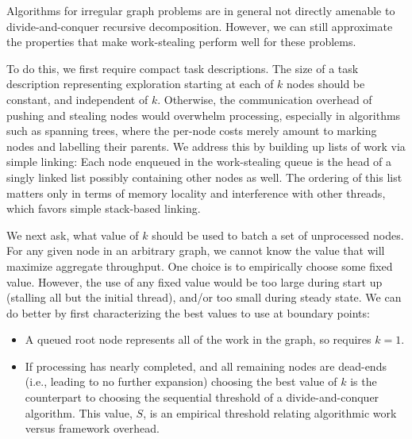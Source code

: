 Algorithms for irregular graph problems are in general not directly
amenable to divide-and-conquer recursive decomposition. However, we
can still approximate the properties that make work-stealing perform
well for these problems.

To do this, we first require compact task descriptions.  The size of a
task description representing exploration starting at each of $k$ nodes
should be constant, and independent of $k$. Otherwise, the communication
overhead of pushing and stealing nodes would overwhelm processing,
especially in algorithms such as spanning trees, where the per-node
costs merely amount to marking nodes and labelling their parents.  We
address this by building up lists of work via simple linking: Each
node enqueued in the work-stealing queue is the head of a singly
linked list possibly containing other nodes as well. The ordering of
this list matters only in terms of memory locality and interference
with other threads, which favors simple stack-based linking.

We next ask, what value of $k$ should be used to batch a set of
unprocessed nodes. For any given node in an arbitrary graph, we cannot
know the value that will maximize aggregate throughput.
One choice is to empirically choose some fixed value. However,
the use of any fixed value would be too large during start up
(stalling all but the initial thread), and/or too small during
steady state. We can do better by first characterizing the
best values to use at boundary points:
\begin{itemize}
  \item A queued root node represents all of the work in the graph, so
    requires $k=1$.
  \item If processing has nearly completed, and all remaining nodes are
    dead-ends (i.e., leading to no further expansion) choosing the
    best value of $k$ is the counterpart to choosing the sequential
    threshold of a divide-and-conquer algorithm.  This value, $S$, is an
    empirical threshold relating algorithmic work versus framework
    overhead.  
\end{itemize}

